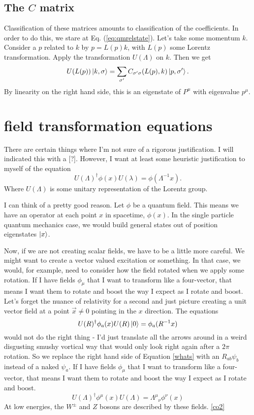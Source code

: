 \documentclass[main.tex]{subfiles}
\begin{document}
\subsection{The $C$ matrix}
Classification of these matrices amounts to classification of the coefficients. In order to do this, we stare at Eq. (\ref{eq:qmrelstate}). Let's take some momentum $k$. Consider a $p$ related to $k$ by $p = L(p) k$, with $L(p)$ some Lorentz transformation. Apply the transformation $U(\Lambda)$ on $k$. Then we get
\[
U(L(p))\ket{k,\sigma} = \sum_{\sigma'} C_{\sigma' \sigma} (L(p),k) \ket{p,\sigma'}.
\]
By linearity on the right hand side, this is an eigenstate of $P^\mu$ with eigenvalue $p^\mu$. 

\section{field transformation equations}
There are certain things where I'm not sure of a rigorous justification. I will indicated this with a [?]. However, I want at least some heuristic justification to myself of the equation
\begin{equation} \label{desiderata} 
U(\Lambda)^{\dagger} \phi(x) U(\lambda) = \phi(\Lambda^{-1} x).
\end{equation}
Where $U(\Lambda)$ is some unitary representation of the Lorentz group.

I can think of a pretty good reason. Let $\phi$ be a quantum field. This means we have an operator at each point $x$ in spacetime, $\phi(x)$. In the single particle quantum mechanics case, we would build general states out of position eigenstates $\ket{x}$. 


Now, if we are not creating scalar fields, we have to be a little more careful. We might want to create a vector valued excitation or something. In that case, we would, for example, need to consider how the field rotated when we apply some rotation. If I have fields $\phi_\mu$ that I want to transform like a four-vector, that means I want them to rotate and boost the way I expect as I rotate and boost. Let's forget the nuance of relativity for a second and just picture creating a unit vector field at a point $\vec{x} \neq 0$ pointing in the $x$ direction. The equations
\begin{equation} \label{whats}
U(R)^\dagger \phi_a (x) U(R) \ket{0} = \phi_a (R^{-1} x) 
\end{equation}
would not do the right thing - I'd just translate all the arrows around in a weird disgusting smushy vortical way that would only look right again after a $2\pi$ rotation. So we replace the right hand side of Equation \ref{whats} with an $R_{ab} \psi_b$ instead of a naked $\psi_a$. If I have fields $\phi_\mu$ that I want to transform like a four-vector, that means I want them to rotate and boost the way I expect as I rotate and boost.
\[
U(\Lambda)^\dagger \phi^\mu (x) U(\Lambda) = {\Lambda^\mu}_\nu \phi^\nu (x)
\]
At low energies, the $W^\pm$ and $Z$ bosons are described by these fields. \ref{co2}
\end{document}
